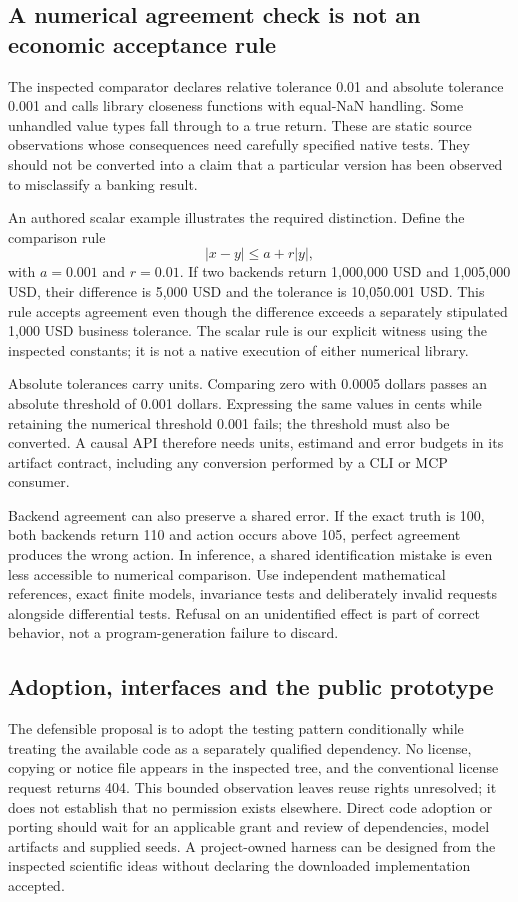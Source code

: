 \subsection{A numerical agreement check is not an economic acceptance rule}
The inspected comparator declares relative tolerance 0.01 and absolute tolerance 0.001 and calls library closeness functions with equal-NaN handling. Some unhandled value types fall through to a true return. These are static source observations whose consequences need carefully specified native tests. They should not be converted into a claim that a particular version has been observed to misclassify a banking result.~\citep{exec24_titanfuzz_source}

An authored scalar example illustrates the required distinction. Define the comparison rule
\[
 |x-y|\leq a+r|y|,
\]
with $a=0.001$ and $r=0.01$. If two backends return 1,000,000 USD and 1,005,000 USD, their difference is 5,000 USD and the tolerance is 10,050.001 USD. This rule accepts agreement even though the difference exceeds a separately stipulated 1,000 USD business tolerance. The scalar rule is our explicit witness using the inspected constants; it is not a native execution of either numerical library.~\citep{exec24_affordance_fuzzing_reference}

Absolute tolerances carry units. Comparing zero with 0.0005 dollars passes an absolute threshold of 0.001 dollars. Expressing the same values in cents while retaining the numerical threshold 0.001 fails; the threshold must also be converted. A causal API therefore needs units, estimand and error budgets in its artifact contract, including any conversion performed by a CLI or MCP consumer.~\citep{exec24_affordance_fuzzing_reference}

Backend agreement can also preserve a shared error. If the exact truth is 100, both backends return 110 and action occurs above 105, perfect agreement produces the wrong action. In inference, a shared identification mistake is even less accessible to numerical comparison. Use independent mathematical references, exact finite models, invariance tests and deliberately invalid requests alongside differential tests. Refusal on an unidentified effect is part of correct behavior, not a program-generation failure to discard.~\citep{exec24_affordance_fuzzing_reference}

\subsection{Adoption, interfaces and the public prototype}
The defensible proposal is to adopt the testing pattern conditionally while treating the available code as a separately qualified dependency. No license, copying or notice file appears in the inspected tree, and the conventional license request returns 404. This bounded observation leaves reuse rights unresolved; it does not establish that no permission exists elsewhere. Direct code adoption or porting should wait for an applicable grant and review of dependencies, model artifacts and supplied seeds. A project-owned harness can be designed from the inspected scientific ideas without declaring the downloaded implementation accepted.~\citep{exec24_titanfuzz_source,exec24_affordance_fuzzing_reference}

